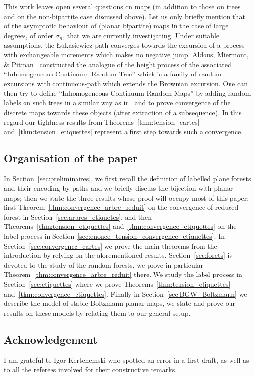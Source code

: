 \documentclass[AHL,Unicode,longabstracts,published]{cedram}
\newcommand{\1}{\ensembles{1}}
\begin{document}
This work leaves open several questions on maps (in addition to those on trees and on the non-bipartite case discussed above). Let us only briefly mention that of the asymptotic behaviour of (planar bipartite) maps in the case of large degrees, of order $\sigma_n$, that we are currently investigating. Under suitable assumptions, the {\L}ukasiewicz path converges towards the excursion of a process with exchangeable increments which makes no negative jump. Aldous, Miermont, \& Pitman~\cite{AMP04} constructed the analogue of the height process of the associated ``Inhomogeneous Continuum Random Tree'' which is a family of random excursions with continuous-path which extends the Brownian excursion. One can then try to define ``Inhomogeneous Continuum Random Maps'' by adding random labels on such trees in a similar way as in~\cite{LGM11} and to prove convergence of the discrete maps towards these objects (after extraction of a subsequence). In this regard our tightness results from Theorems~\ref{thm:tension_cartes} and~\ref{thm:tension_etiquettes} represent a first step towards such a convergence.


\subsection{Organisation of the paper}
In Section~\ref{sec:preliminaires}, we first recall the definition of labelled plane forests and their encoding by paths and we briefly discuss the bijection with planar maps; then we state the three results whose proof will occupy most of this paper: first Theorem~\ref{thm:convergence_arbre_reduit} on the convergence of reduced forest in Section~\ref{sec:arbres_etiquetes}, and then Theorems~\ref{thm:tension_etiquettes} and~\ref{thm:convergence_etiquettes} on the label process in Section~\ref{sec:enonce_tension_convergence_etiquettes}. In Section~\ref{sec:convergence_cartes} we prove the main theorems from the introduction by relying on the aforementioned results. Section~\ref{sec:forets} is devoted to the study of the random forests, we prove in particular Theorem~\ref{thm:convergence_arbre_reduit} there. We study the label process in Section~\ref{sec:etiquettes} where we prove Theorems~\ref{thm:tension_etiquettes} and~\ref{thm:convergence_etiquettes}. Finally in Section~\ref{sec:BGW_Boltzmann} we describe the model of stable Boltzmann planar maps, we state and prove our results on these models by relating them to our general setup.



\subsection*{Acknowledgement}
I am grateful to Igor Kortchemski who spotted an error in a first draft, as well as to all the referees involved for their constructive remarks.
\end{document}
